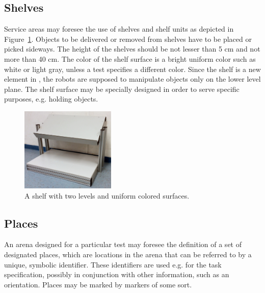 
\subsection{Shelves}
Service areas may foresee the use of shelves and shelf units as depicted in Figure~\ref{fig:shelf}. Objects to be delivered or removed from shelves have to be placed or picked sideways. The height of the shelves should be not lesser than 5 cm and not more than 40 cm. The color of the shelf surface is a bright uniform color such as white or light gray, unless a test specifies a different color.
Since the shelf is a new element in \RCAW, the robots are supposed to manipulate objects only on the lower level plane. 
The shelf surface may be specially designed in order to serve specific purposes, e.g. holding objects.

\begin{figure} [h!]
\centering
\includegraphics[width=0.4\textwidth ]{./images/shelf.jpg}
\caption{A shelf with two levels and uniform colored surfaces.}
\label{fig:shelf}
\end{figure}


\subsection{Places}
An arena designed for a particular test may foresee the definition of a set of designated places, which are locations in the arena that can be referred to by a unique, symbolic identifier. These identifiers are used e.g. for the task specification, possibly in conjunction with other information, such as an orientation. Places may be marked by markers of some sort.

